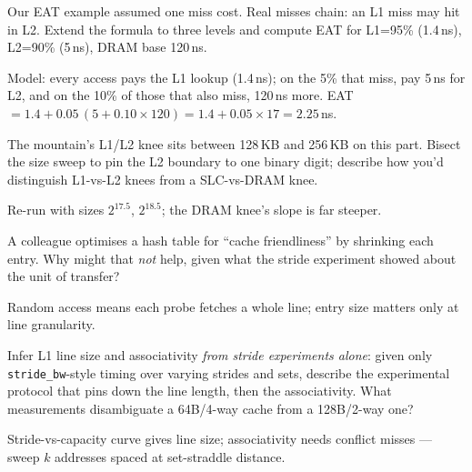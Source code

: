 \begin{exercise}[medium]

Our EAT example assumed one miss cost. Real misses chain: an L1 miss
may hit in L2. Extend the formula to three levels and compute EAT
for L1=95\% (1.4\,ns), L2=90\% (5\,ns), DRAM base 120\,ns.
\end{exercise}
\begin{solution}[hint]
Model: every access pays the L1 lookup (1.4\,ns); on the 5\% that miss, pay 5\,ns for L2, and on the 10\% of those that also miss, 120\,ns more.
EAT $=1.4+0.05\,(5+0.10\times120)=1.4+0.05\times17=2.25$\,ns.
\end{solution}

\begin{exercise}[medium]

The mountain's L1/L2 knee sits between 128\,KB and 256\,KB on this
part. Bisect the size sweep to pin the L2 boundary to one binary
digit; describe how you'd distinguish L1-vs-L2 knees from a
SLC-vs-DRAM knee.
\end{exercise}
\begin{solution}[hint]
Re-run with sizes $2^{17.5}$, $2^{18.5}$; the DRAM knee's
slope is far steeper.
\end{solution}

\begin{exercise}[medium]

A colleague optimises a hash table for ``cache friendliness'' by
shrinking each entry. Why might that \emph{not} help, given what
the stride experiment showed about the unit of transfer?
\end{exercise}
\begin{solution}[hint]
Random access means each probe fetches a whole line; entry
size matters only at line granularity.
\end{solution}

\begin{exercise}[hard]

Infer L1 line size and associativity \emph{from stride experiments
alone}: given only \texttt{stride\_bw}-style timing over varying
strides and sets, describe the experimental protocol that pins down
the line length, then the associativity. What measurements disambiguate
a 64B/4-way cache from a 128B/2-way one?
\end{exercise}
\begin{solution}[hint]
Stride-vs-capacity curve gives line size; associativity needs
conflict misses --- sweep $k$ addresses spaced at set-straddle
distance.
\end{solution}

